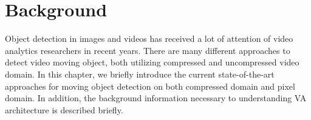 \chapter{Background}
Object detection in images and videos has received a lot of attention of video analytics researchers in recent years. There are many different approaches to detect video moving object, both utilizing compressed and uncompressed video domain. In this chapter, we briefly introduce the current state-of-the-art approaches for moving object detection on both compressed domain and pixel domain. In addition, the background information necessary to understanding VA architecture is described briefly.
